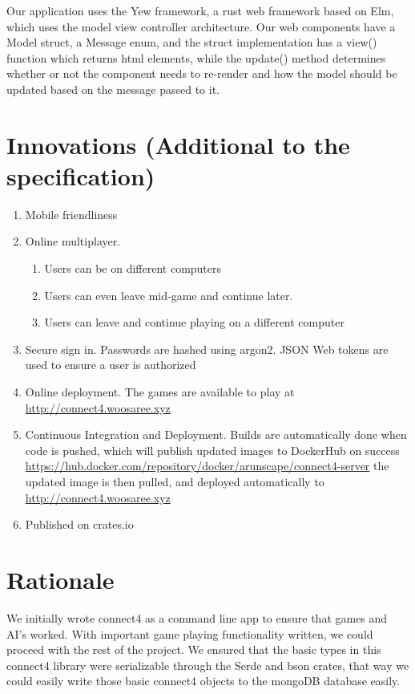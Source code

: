\documentclass[letterpaper]{article}
\begin{document}
Our application uses the Yew framework, a rust web framework based on Elm, which uses the model
view controller architecture. Our web components have a Model struct, a Message enum, and the
struct implementation has a view() function which returns html elements, while the update()
method determines whether or not the component needs to re-render and how the model should be updated
based on the message passed to it.



\section{Innovations (Additional to the specification)}
\begin{enumerate}
    \item Mobile friendliness
    \item Online multiplayer.
        \begin{enumerate}
            \item Users can be on different computers
            \item Users can even leave mid-game and continue later.
            \item Users can leave and continue playing on a different computer
        \end{enumerate}
    \item Secure sign in. Passwords are hashed using argon2. JSON Web tokens are used to ensure a user
        is authorized
    \item Online deployment. The games are available to play at \url{http://connect4.woosaree.xyz}
    \item Continuous Integration and Deployment. Builds are automatically done when code is pushed,
        which will publish updated images to DockerHub on success \url{https://hub.docker.com/repository/docker/arunscape/connect4-server}
        the updated image is then pulled, and deployed automatically to \url{http://connect4.woosaree.xyz}
    \item Published on crates.io

\end{enumerate}

\section{Rationale}

We initially wrote connect4 as a command line app to ensure that games and AI's worked. With important game playing functionality written, we could proceed with the rest of the project. We ensured that the basic types in this connect4 library were serializable through the Serde and bson crates, that way we could easily write those basic connect4 objects to the mongoDB database easily.
\end{document}
